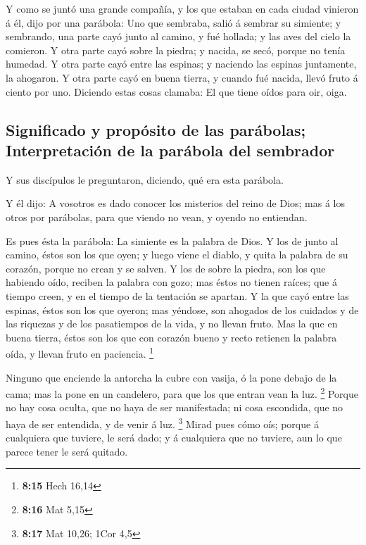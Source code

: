  Y como se juntó una grande compañía, y los que estaban en
cada ciudad vinieron á él, dijo por una parábola:  Uno que
sembraba, salió á sembrar su simiente; y sembrando, una parte cayó junto
al camino, y fué hollada; y las aves del cielo la comieron.
 Y otra parte cayó sobre la piedra; y nacida, se secó,
porque no tenía humedad.  Y otra parte cayó entre las
espinas; y naciendo las espinas juntamente, la ahogaron. 
Y otra parte cayó en buena tierra, y cuando fué nacida, llevó fruto á
ciento por uno. Diciendo estas cosas clamaba: El que tiene oídos para
oir, oiga.

\hypertarget{significado-y-propuxf3sito-de-las-paruxe1bolas-interpretaciuxf3n-de-la-paruxe1bola-del-sembrador}{%
\subsection{Significado y propósito de las parábolas; Interpretación de
la parábola del
sembrador}\label{significado-y-propuxf3sito-de-las-paruxe1bolas-interpretaciuxf3n-de-la-paruxe1bola-del-sembrador}}

 Y sus discípulos le preguntaron, diciendo, qué era esta
parábola.

 Y él dijo: A vosotros es dado conocer los misterios del
reino de Dios; mas á los otros por parábolas, para que viendo no vean, y
oyendo no entiendan.

 Es pues ésta la parábola: La simiente es la palabra de
Dios.  Y los de junto al camino, éstos son los que oyen;
y luego viene el diablo, y quita la palabra de su corazón, porque no
crean y se salven.  Y los de sobre la piedra, son los que
habiendo oído, reciben la palabra con gozo; mas éstos no tienen raíces;
que á tiempo creen, y en el tiempo de la tentación se apartan.
 Y la que cayó entre las espinas, éstos son los que
oyeron; mas yéndose, son ahogados de los cuidados y de las riquezas y de
los pasatiempos de la vida, y no llevan fruto.  Mas la
que en buena tierra, éstos son los que con corazón bueno y recto
retienen la palabra oída, y llevan fruto en paciencia. \footnote{\textbf{8:15}
  Hech 16,14}

 Ninguno que enciende la antorcha la cubre con vasija, ó
la pone debajo de la cama; mas la pone en un candelero, para que los que
entran vean la luz. \footnote{\textbf{8:16} Mat 5,15} 
Porque no hay cosa oculta, que no haya de ser manifestada; ni cosa
escondida, que no haya de ser entendida, y de venir á luz. \footnote{\textbf{8:17}
  Mat 10,26; 1Cor 4,5}  Mirad pues cómo oís; porque á
cualquiera que tuviere, le será dado; y á cualquiera que no tuviere, aun
lo que parece tener le será quitado.

